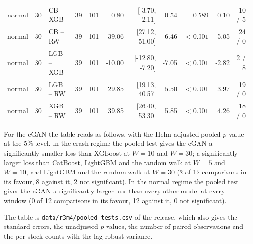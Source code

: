\documentclass[11pt,a4paper]{article}
\begin{document}
{\begin{longtable}{lrlrrrrrrrr}
normal & 30 & CB -- XGB & 39 & 101 & -0.80 & [-3.70, 2.11] & -0.54 & 0.589 & 0.10 & 10 / 5 \\
normal & 30 & CB -- RW & 39 & 101 & 39.06 & [27.12, 51.00] & 6.46 & $<0.001$ & 5.05 & 24 / 0 \\
normal & 30 & LGB -- XGB & 39 & 101 & -10.00 & [-12.80, -7.20] & -7.05 & $<0.001$ & -2.82 & 2 / 8 \\
normal & 30 & LGB -- RW & 39 & 101 & 29.85 & [19.13, 40.57] & 5.50 & $<0.001$ & 3.97 & 19 / 0 \\
normal & 30 & XGB -- RW & 39 & 101 & 39.85 & [26.40, 53.30] & 5.85 & $<0.001$ & 4.26 & 18 / 0 \\
\end{longtable}}

For the cGAN the table reads as follows, with the Holm-adjusted pooled $p$-value at the 5\% level. In the crash regime the pooled test gives the cGAN a significantly smaller loss than XGBoost at $W = 10$ and $W = 30$; a significantly larger loss than CatBoost, LightGBM and the random walk at $W = 5$ and $W = 10$, and LightGBM and the random walk at $W = 30$ (2 of 12 comparisons in its favour, 8 against it, 2 not significant). In the normal regime the pooled test gives the cGAN a significantly larger loss than every other model at every window (0 of 12 comparisons in its favour, 12 against it, 0 not significant).

The table is \nolinkurl{data/r3m4/pooled_tests.csv} of the release, which
also gives the standard errors, the unadjusted $p$-values, the number of
paired observations and the per-stock counts with the lag-robust variance.
\end{document}
